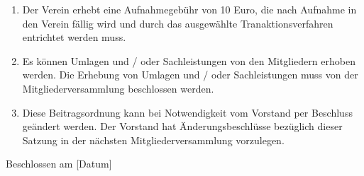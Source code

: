 \documentclass[a4paper,ngerman]{scrartcl}
\begin{document}
\begin{enumerate}
\item Der Verein erhebt eine Aufnahmegebühr von 10 Euro, die nach Aufnahme in den Verein fällig wird und durch das ausgewählte Tranaktionsverfahren entrichtet werden muss.
\item Es können Umlagen und / oder Sachleistungen von den Mitgliedern erhoben werden. Die Erhebung von Umlagen und / oder Sachleistungen muss von der Mitgliederversammlung beschlossen werden.
\item Diese Beitragsordnung kann bei Notwendigkeit vom Vorstand per Beschluss geändert werden. Der Vorstand hat Änderungsbeschlüsse bezüglich dieser Satzung in der nächsten Mitgliederversammlung vorzulegen.
\end{enumerate}


Beschlossen am [Datum]
\end{document}
